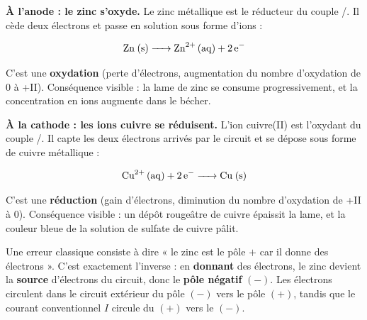 \documentclass[11pt]{article}
\begin{document}
\textbf{À l'anode : le zinc s'oxyde.} Le zinc métallique est le réducteur du couple /. Il cède deux électrons et passe en solution sous forme d'ions  :

\[ \ce{Zn (s) -> Zn^2+ (aq) + 2 e-} \]

C'est une \textbf{oxydation} (perte d'électrons, augmentation du nombre d'oxydation de 0 à +II). Conséquence visible : la lame de zinc se consume progressivement, et la concentration en ions  augmente dans le bécher.

\textbf{À la cathode : les ions cuivre se réduisent.} L'ion cuivre(II) est l'oxydant du couple /. Il capte les deux électrons arrivés par le circuit et se dépose sous forme de cuivre métallique :

\[ \ce{Cu^2+ (aq) + 2 e- -> Cu (s)} \]

C'est une \textbf{réduction} (gain d'électrons, diminution du nombre d'oxydation de +II à 0). Conséquence visible : un dépôt rougeâtre de cuivre épaissit la lame, et la couleur bleue de la solution de sulfate de cuivre pâlit.

\begin{attention}
Une erreur classique consiste à dire « le zinc est le pôle $+$ car il donne des électrons ». C'est exactement l'inverse : en \textbf{donnant} des électrons, le zinc devient la \textbf{source} d'électrons du circuit, donc le \textbf{pôle négatif} $(-)$. Les électrons circulent dans le circuit extérieur du pôle $(-)$ vers le pôle $(+)$, tandis que le courant conventionnel $I$ circule du $(+)$ vers le $(-)$.
\end{attention}
\end{document}
